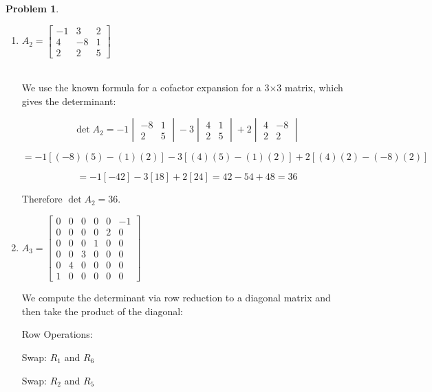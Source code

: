 \documentclass[12pt, oneside]{amsart}
\theoremstyle{definition}
\newtheorem{prob}{Problem}
\begin{document}
\begin{prob}
\begin{enumerate}
    \item $A_2= \left[\begin{matrix}
        -1 & 3 & 2 \\4 & -8 & 1 \\
        2 & 2 & 5
    \end{matrix}\right]$\\\\
    
    \begin{solution}
    We use the known formula for a cofactor expansion for a 3×3 matrix, which gives the determinant:
    
    \[
    \det A_2 = -1 \begin{vmatrix} -8 & 1 \\ 2 & 5 \end{vmatrix} - 3 \begin{vmatrix} 4 & 1 \\ 2 & 5 \end{vmatrix} + 2 \begin{vmatrix} 4 & -8 \\ 2 & 2 \end{vmatrix}
    \]
    
    \[
    = -1[(-8)(5) - (1)(2)] - 3[(4)(5) - (1)(2)] + 2[(4)(2) - (-8)(2)]
    \]
    
    \[
    = -1[-42] - 3[18] + 2[24] = 42 - 54 + 48 = 36
    \]
    
    Therefore $\det A_2 = 36$.
    \end{solution}

    \item $A_3= \left[\begin{matrix}
        0 & 0 & 0 & 0 & 0 & -1 \\
        0 & 0 & 0 & 0 & 2 & 0 \\ 
        0 & 0 & 0 & 1 & 0 & 0 \\
        0 & 0 & 3 & 0 & 0 & 0 \\
        0 & 4 & 0 & 0 & 0 & 0 \\
        1 & 0 & 0 & 0 & 0 & 0 
    \end{matrix}\right]$
    
    \begin{solution}
    We compute the determinant via row reduction to a diagonal matrix and then take the product of the diagonal:
    
    Row Operations:
    
    Swap: $R_1$ and $R_6$

    Swap: $R_2$ and $R_5$


\end{solution}
\end{enumerate}
\end{prob}
\end{document}
